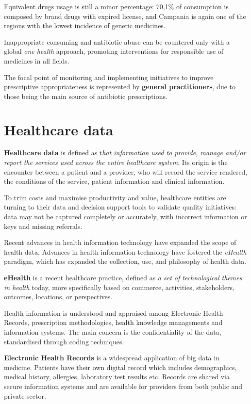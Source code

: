 Equivalent drugs usage is still a minor percentage: 70,1\% of consumption is composed by brand drugs with expired license, and Campania is again one of the regions with the lowest incidence of generic medicines.

Inappropriate consuming and antibiotic abuse can be countered only with a global \textit{one health} approach, promoting interventions for responsible use of medicines in all fields\cite{aifa2017}.

The focal point of monitoring and implementing initiatives to improve prescriptive appropriateness is represented by \textbf{general practitioners}, due to those being the main source of antibiotic prescriptions.

\section{Healthcare data}
\textbf{Healthcare data} is defined as t\textit{hat information used to provide, manage and/or report the services used across the entire healthcare system}. Its origin is the encounter between a patient and a provider, who will record the service rendered, the conditions of the service, patient information and clinical information\cite{dataquality}.

To trim costs and maximise productivity and value, healthcare entities are turning to their data and decision support tools to validate quality initiatives: data may not be captured completely or accurately, with incorrect information or keys and missing referrals.

Recent advances in health information technology have expanded the scope of health data. Advances in health information technology have fostered the \textit{eHealth} paradigm, which has expanded the collection, use, and philosophy of health data.

\textbf{eHealth} is a recent healthcare practice, defined as \textit{a set of technological themes in health} today, more specifically based on commerce, activities, stakeholders, outcomes, locations, or perspectives\cite{ehealth}.

Health information is understood and appraised among Electronic Health Records, prescription methodologies, health knowledge managements and information systems. The main concern is the confidentiality of the data, standardised through coding techniques.

\textbf{Electronic Health Records} is a widespread application of big data in medicine. Patients have their own digital record which includes demographics, medical history, allergies, laboratory test results etc. Records are shared via secure information systems and are available for providers from both public and private sector\cite{datapine}.

